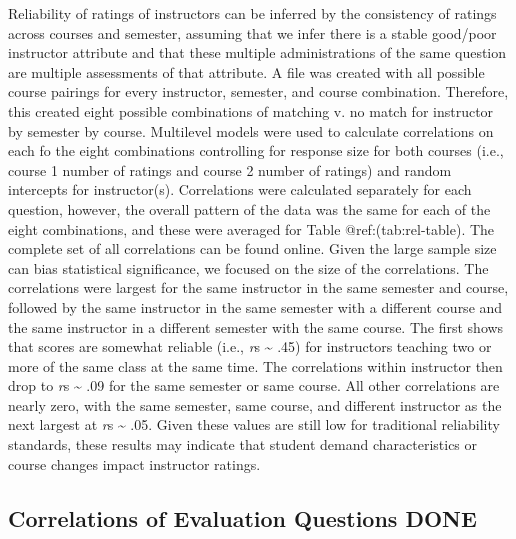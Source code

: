 \documentclass[man]{apa6}
\theoremstyle{definition}
\theoremstyle{definition}
\theoremstyle{definition}
\theoremstyle{remark}
\begin{document}
Reliability of ratings of instructors can be inferred by the consistency
of ratings across courses and semester, assuming that we infer there is
a stable good/poor instructor attribute and that these multiple
administrations of the same question are multiple assessments of that
attribute. A file was created with all possible course pairings for
every instructor, semester, and course combination. Therefore, this
created eight possible combinations of matching v. no match for
instructor by semester by course. Multilevel models were used to
calculate correlations on each fo the eight combinations controlling for
response size for both courses (i.e., course 1 number of ratings and
course 2 number of ratings) and random intercepts for instructor(s).
Correlations were calculated separately for each question, however, the
overall pattern of the data was the same for each of the eight
combinations, and these were averaged for Table @ref:(tab:rel-table).
The complete set of all correlations can be found online. Given the
large sample size can bias statistical significance, we focused on the
size of the correlations. The correlations were largest for the same
instructor in the same semester and course, followed by the same
instructor in the same semester with a different course and the same
instructor in a different semester with the same course. The first shows
that scores are somewhat reliable (i.e., \emph{r}s \textasciitilde{}
.45) for instructors teaching two or more of the same class at the same
time. The correlations within instructor then drop to \emph{r}s
\textasciitilde{} .09 for the same semester or same course. All other
correlations are nearly zero, with the same semester, same course, and
different instructor as the next largest at \emph{r}s \textasciitilde{}
.05. Given these values are still low for traditional reliability
standards, these results may indicate that student demand
characteristics or course changes impact instructor ratings.

\subsection{Correlations of Evaluation Questions
DONE}\label{correlations-of-evaluation-questions-done}
\end{document}
